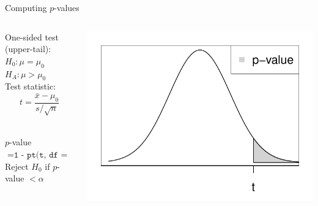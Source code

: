 \documentclass[fleqn, 10pt]{beamer}\usepackage[]{graphicx}\usepackage[]{color}
\begin{document}
\begin{frame}{Computing $p$-values}
\begin{columns}
\begin{column}{0.55\textwidth}
One-sided test (upper-tail):\\
$H_0: \mu = \mu_0$\\
$H_A: \mu > \mu_0$\\
\vspace{10pt}
Test statistic:\\
$$t = \frac{\bar{x} - \mu_0}{s/\sqrt{n}}$$\\
\vspace{10pt}

$p$-value $= \texttt{1 - pt(t, df = n-1)}$\\ 
\vspace{10pt}
Reject $H_0$ if $p$-value $< \alpha$\\
\end{column}
\begin{column}{0.45\textwidth}
\includegraphics[scale=0.5]{figure/pvalue_upper.pdf}
\end{column}
\end{columns}
\vspace{1cm}
\end{frame}
\end{document}
